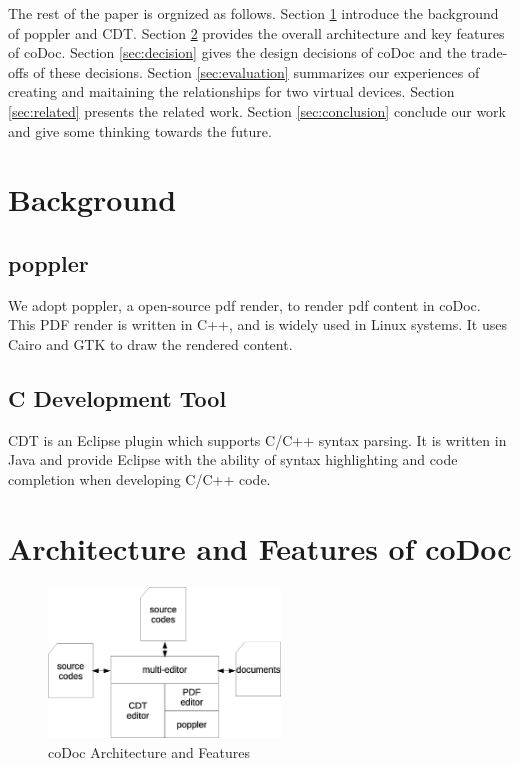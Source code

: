 \documentclass[11pt,letterpaper,oneside]{article}
\begin{document}
The rest of the paper is orgnized as follows. 
Section \ref{sec:background} introduce the background of poppler and CDT.
Section \ref{sec:arch} provides the overall architecture and key features of coDoc.
Section \ref{sec:decision} gives the design decisions of coDoc and the trade-offs of these decisions.
Section \ref{sec:evaluation} summarizes our experiences of creating and maitaining the relationships for two virtual devices.
Section \ref{sec:related} presents the related work.
Section \ref{sec:conclusion} conclude our work and give some thinking towards the future.


\section{Background}
\label{sec:background}
\subsection{poppler}
We adopt poppler, a open-source pdf render, to render pdf content in coDoc.
This PDF render is written in C++, 
and is widely used in Linux systems.
It uses Cairo and GTK to draw the rendered content.

\subsection{C Development Tool}
CDT is an Eclipse plugin which supports C/C++ syntax parsing.
It is written in Java and provide Eclipse with the ability of syntax highlighting and code completion when developing C/C++ code.


\section{Architecture and Features of coDoc}
\label{sec:arch}

\begin{figure}
\begin{center}
\includegraphics[width=0.55\textwidth]{architecture.eps}
\caption{coDoc Architecture and Features}
\label{fig:architecture}
\end{center}
\end{figure}
\end{document}
